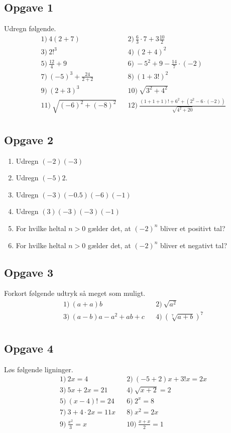 \documentclass[12pt]{article}
\begin{document}
\subsection*{Opgave 1}
Udregn følgende. 
\begin{align*}
	&1) \ 4(2+7)   &&2) \   \frac{6}{3}\cdot 7+3\frac{10}{2}  \\
	&3) \ 2!^3   &&4) \  (2+4)^2   \\
	&5) \  \frac{12}{4} +9 &&6) \  -5^2+9-\frac{14}{7}\cdot(-2)   \\
	&7) \ (-5)^3+\frac{24}{2+2}    &&8) \  (1+3!)^2   \\
	&9) \  (2+3)^3  &&10) \  \sqrt{3^2+4^2}   \\
	&11) \ \sqrt{(-6)^2+(-8)^2}   &&12) \  \frac{(1+1+1)!+6^2 + (2^2-6\cdot(-2))}{\sqrt{4^2+20}}   \\
\end{align*}

\subsection*{Opgave 2}

\begin{enumerate}[label=\roman*)]
	\item Udregn $(-2)(-3)$
	\item Udregn $(-5)2$.
	\item Udregn $(-3)(-0.5)(-6)(-1)$
	\item Udregn $(3)(-3)(-3)(-1)$
	\item For hvilke heltal $n>0$ gælder det, at $(-2)^n$ bliver et positivt tal?
	\item For hvilke heltal $n>0$ gælder det, at $(-2)^n$ bliver et negativt tal?
\end{enumerate}



\subsection*{Opgave 3}
Forkort følgende udtryk så meget som muligt.
\begin{align*}
	&1) \  (a+a)b  &&2) \  \sqrt{a^2}   \\
	&3) \  (a-b)a-a^2+ab+c  &&4) \ (\sqrt[7]{a+b})^7    \\
\end{align*}


\subsection*{Opgave 4}
Løs følgende ligninger.	
\begin{align*}
	&1) \  2x = 4  &&2) \ (-5+2)x+3!x = 2x   \\
	&3) \  5x+2x = 21  &&4) \ \sqrt{x+2} = 2   \\
	&5) \  (x-4)! = 24  &&6) \  2^x = 8  \\
	&7) \  3+4\cdot 2x = 11x  &&8) \ x^2 = 2x   \\
	&9) \  \frac{x^2}{3} = x  &&10) \  \frac{x+x}{2} = 1  \\	
\end{align*}
\end{document}
